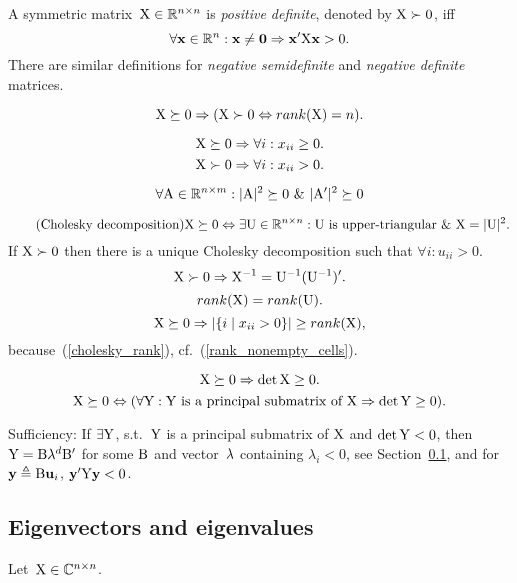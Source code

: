 \documentclass[10pt,a4paper]{article}
\theoremstyle{plain} \newtheorem{Lem}{Lemma}
\begin{document}
A symmetric matrix~$\mathrm X \in \mathbb R^{n \times n}$ is {\em positive     definite}, denoted by $\mathrm X \succ   0$, iff
$$\forall \mathbf x \in \mathbb R^n: \mathbf x \ne \mathbf 0 \Rightarrow \mathbf x' \mathrm X \mathbf x > 0. $$
There are similar definitions for {\em negative semidefinite} and {\em negative definite} matrices.

$$ \mathrm X \succeq 0 \Rightarrow (\mathrm X \succ 0 \Leftrightarrow rank(\mathrm X) = n). $$

$$ \mathrm X \succeq 0 \Rightarrow \forall i : x_{ii} \ge 0. $$
$$ \mathrm X \succ 0 \Rightarrow \forall i : x_{ii} > 0. $$

$$ \forall \mathrm A \in \mathbb R^{n \times m}: |\mathrm A|^2 \succeq 0 \ \& \  |\mathrm A'|^2 \succeq 0 $$

\begin{equation} \tag{Cholesky decomposition}
\mathrm X \succeq 0 \Leftrightarrow \exists \mathrm U \in \mathbb R^{n \times n} : \mathrm U \text{ is upper-triangular} \ \& \  \mathrm X = |\mathrm U|^2.
\end{equation}
If $\mathrm X \succ 0$ then there is a unique Cholesky decomposition such that $\forall i : u_{ii} > 0$.
$$ \mathrm X \succ 0 \Rightarrow \mathrm X^{-1} = \mathrm U^{-1} (\mathrm U^{-1})'. $$
\begin{equation} \label{cholesky_rank}
rank(\mathrm X) = rank(\mathrm U).
\end{equation}
\begin{equation} \label{rank_nonempty_diagonal}
\mathrm X \succeq 0 \Rightarrow |\{i \mid x_{ii} > 0\}| \ge rank(\mathrm X),
\end{equation}
because~(\ref{cholesky_rank}), cf.~(\ref{rank_nonempty_cells}).

$$ \mathrm X \succeq 0 \Rightarrow \det \mathrm X \ge 0. $$
$$ \mathrm X \succeq 0 \Leftrightarrow (\forall \mathrm Y : \text{$\mathrm Y$ is a principal submatrix of $\mathrm X$} \Rightarrow \det \mathrm Y \ge 0). $$
\proof
{
    Sufficiency: If $\exists \mathrm Y$, s.t.~$\mathrm Y$ is a principal submatrix of $\mathrm X$ and $\det \mathrm Y < 0$,
    then $\mathrm Y = \mathrm B \mathbf \lambda^d \mathrm B'$ for some $\mathrm B$ and vector~$\mathbf \lambda$ containing $\lambda_i < 0$, see Section~\ref{eigen},
    and for $\mathbf y \triangleq \mathrm B \mathbf u_i$, $\mathbf y' \mathrm Y \mathbf y < 0$.

}



\subsection{Eigenvectors and eigenvalues} \label{eigen}

Let~$\mathrm X \in \mathbb C^{n \times n}$.
\end{document}
